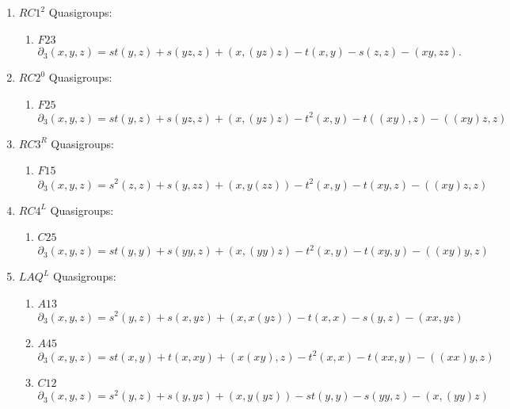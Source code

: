 \documentclass[11pt]{amsart}
\theoremstyle{definition}
\begin{document}
\begin{enumerate}
\item[(17)] $RC1^2$ Quasigroups:

    \begin{enumerate}
        \item $F23$
        \[ \partial_3(x,y,z)=  st (y, z) + s (y z, z) + (x, (y z) z)  - t(x, y)  - s (z, z)  - (x y, z z).  \]
    \end{enumerate}

\item[(18)] $RC2^0$ Quasigroups:

    \begin{enumerate}
        \item $F25$
        \[ \partial_3(x,y,z)= st (y, z) + s (y z, z) + (x, (y z) z) - t^2 (x, y)  -  t((x y), z)  -((x y) z, z)  \]
    \end{enumerate}

\item[(19)] $RC3^R$ Quasigroups:

    \begin{enumerate}
        \item $F15$
        \[ \partial_3(x,y,z)= s^2 (z, z) + s (y, z z) + (x, y (z z)) - t^2 (x, y)     -
  t (x y, z)    -((x y) z, z) \]
    \end{enumerate}

\item[(20)] $RC4^L$ Quasigroups:

    \begin{enumerate}
        \item $C25$
        \[ \partial_3(x,y,z)=st (y, y) + s (y y, z) + (x, (y y) z) - t^2 (x, y)   - 
 t (x y, y)  -((x y) y, z)    \]
    \end{enumerate}

\item[(21)] $LAQ^L$ Quasigroups:

    \begin{enumerate}
        \item $A13$
        \[ \partial_3(x,y,z)=  s^2 (y, z) + s (x, y z) + (x, x (y z)) - t(x, x)   - s (y, z)  -(x x, y z)    \]
        \item $A45$
        \[ \partial_3(x,y,z)= st (x, y) + 
 t (x, x y)  + (x (x y), z) - t^2 (x, x) - t(x x, y)    -((x x) y, z) \]
        \item $C12$
        \[ \partial_3(x,y,z)=  s^2 (y, z) + 
 s (y, y z) + (x, y (y z)) - st(y, y)  - s (y y, z)     - (x, (y y) z)  \]
    \end{enumerate}


\end{enumerate}
\end{document}
